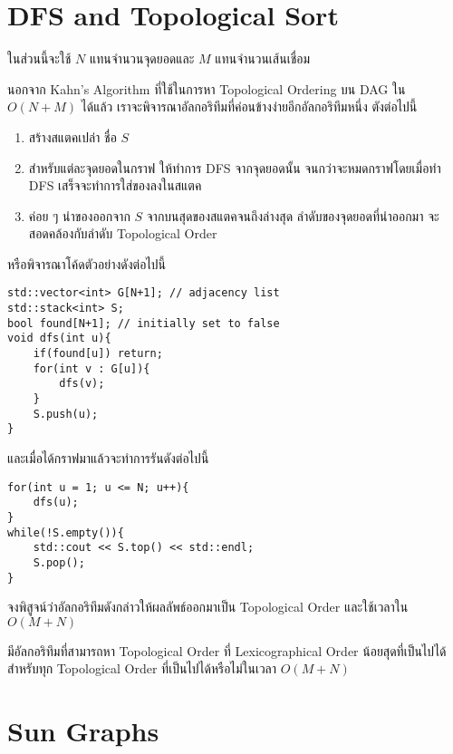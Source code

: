\section{DFS and Topological Sort}

ในส่วนนี้จะใช้ $N$ แทนจำนวนจุดยอดและ $M$ แทนจำนวนเส้นเชื่อม

นอกจาก Kahn's Algorithm ที่ใช้ในการหา Topological Ordering บน DAG ใน $O(N+M)$ ได้แล้ว เราจะพิจารณาอัลกอริทึมที่ค่อนข้างง่ายอีกอัลกอริทึมหนึ่ง ตังต่อไปนี้

\begin{enumerate}[nosep]
    \item สร้างสแตคเปล่า ชื่อ $S$
    \item สำหรับแต่ละจุดยอดในกราฟ ให้ทำการ DFS จากจุดยอดนั้น จนกว่าจะหมดกราฟโดยเมื่อทำ DFS เสร็จจะทำการใส่ของลงในสแตค
    \item ค่อย ๆ นำของออกจาก $S$ จากบนสุดของสแตคจนถึงล่างสุด ลำดับของจุดยอดที่นำออกมา จะสอดคล้องกับลำดับ Topological Order
\end{enumerate}

หรือพิจารณาโค้ดตัวอย่างดังต่อไปนี้

\begin{lstlisting}
std::vector<int> G[N+1]; // adjacency list
std::stack<int> S;
bool found[N+1]; // initially set to false
void dfs(int u){
    if(found[u]) return;
    for(int v : G[u]){
        dfs(v);
    }
    S.push(u);
}
\end{lstlisting}

และเมื่อได้กราฟมาแล้วจะทำการรันดังต่อไปนี้

\begin{lstlisting}
for(int u = 1; u <= N; u++){
    dfs(u);
}
while(!S.empty()){
    std::cout << S.top() << std::endl;
    S.pop();
}
\end{lstlisting}

\begin{exercise}
จงพิสูจน์ว่าอัลกอริทึมดังกล่าวให้ผลลัพธ์ออกมาเป็น Topological Order และใช้เวลาใน $O(M+N)$
\end{exercise}

\begin{bonus}
มีอัลกอริทึมที่สามารถหา Topological Order ที่ Lexicographical Order น้อยสุดที่เป็นไปได้สำหรับทุก Topological Order ที่เป็นไปได้หรือไม่ในเวลา $O(M+N)$
\end{bonus}

\section{Sun Graphs}

